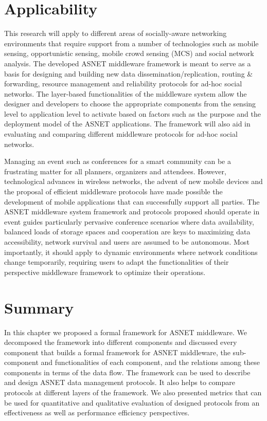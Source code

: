 \section{Applicability}\label{Chap3_04}
This research will apply to different areas of socially-aware networking environments that require support from a number of technologies such as mobile sensing, opportunistic sensing, mobile crowd sensing (MCS) and social network analysis. The developed ASNET middleware framework is meant to serve as a basis for designing and building new data dissemination/replication, routing \& forwarding, resource management and reliability protocols for ad-hoc social networks. The layer-based functionalities of the middleware system allow the designer and developers to choose the appropriate components from the sensing level to application level to activate based on factors such as the purpose and the deployment model of the ASNET applications. The framework will also aid in evaluating and comparing different middleware protocols for ad-hoc social networks.

Managing an event such as conferences for a smart community can be a frustrating matter for all planners, organizers and attendees. However, technological advances in wireless networks, the advent of new mobile devices and the proposal of efficient middleware protocols have made possible the development of mobile applications that can successfully support all parties. The ASNET middleware system framework and protocols proposed should operate in event guides particularly pervasive conference scenarios where data availability, balanced loads of storage spaces and cooperation are keys to maximizing data accessibility, network survival and users are assumed to be autonomous. Most importantly, it should apply to dynamic environments where network conditions change temporarily, requiring users to adapt the functionalities of their perspective middleware framework to optimize their operations.

\section{Summary}\label{Chap3_05}
In this chapter we proposed a formal framework for ASNET middleware. We decomposed the framework into different components and discussed every component that builds a formal framework for ASNET middleware, the sub-component and functionalities of each component, and the relations among these components in terms of the data flow. The framework can be used to describe and design ASNET data management protocols. It also helps to compare protocols at different layers of the framework. We also presented metrics that can be used for quantitative and qualitative evaluation of designed protocols from an effectiveness as well as performance efficiency perspectives.


